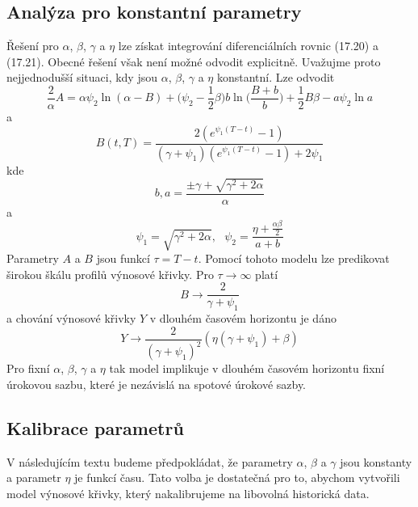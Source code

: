 \documentclass[a4paper]{book}
\begin{document}
\subsection{Analýza pro konstantní parametry}

Řešení pro $\alpha$, $\beta$, $\gamma$ a $\eta$ lze získat integrování diferenciálních rovnic (17.20) a (17.21). Obecné řešení však není možné odvodit explicitně. Uvažujme proto nejjednodušší situaci, kdy jsou $\alpha$, $\beta$, $\gamma$ a $\eta$ konstantní. Lze odvodit
\begin{equation}
\frac{2}{\alpha}A = \alpha \psi_2 \ln(\alpha - B) + \Bigg(\psi_2 - \frac{1}{2}\beta \Bigg) b \ln \Bigg(\frac{B + b}{b}\Bigg) + \frac{1}{2}B\beta - a \psi_2 \ln a 
\end{equation}
a
\begin{equation}
B(t,T) = \frac{2(e^{\psi_1(T - t)} - 1)}{(\gamma + \psi_1)(e^{\psi_1(T-t)} - 1) + 2 \psi_1}
\end{equation}
kde
\begin{equation*}
b,a = \frac{\pm \gamma + \sqrt{\gamma^2 + 2 \alpha}}{\alpha}
\end{equation*}
a
\begin{equation*}
\psi_1 = \sqrt{\gamma^2 + 2 \alpha}, ~~~ \psi_2 = \frac{\eta + \frac{\alpha \beta}{2}}{a + b}
\end{equation*}
Parametry $A$ a $B$ jsou funkcí $\tau = T - t$. Pomocí tohoto modelu lze predikovat širokou škálu profilů výnosové křivky. Pro $\tau \rightarrow \infty$ platí
\begin{equation*}
B \rightarrow \frac{2}{\gamma + \psi_1}
\end{equation*}
a chování výnosové křivky $Y$ v dlouhém časovém horizontu je dáno
\begin{equation*}
Y \rightarrow \frac{2}{(\gamma + \psi_1)^2}(\eta(\gamma + \psi_1) + \beta)
\end{equation*}
Pro fixní $\alpha$, $\beta$, $\gamma$ a $\eta$ tak model implikuje v dlouhém časovém horizontu fixní úrokovou sazbu, které je nezávislá na spotové úrokové sazby.

\subsection{Kalibrace parametrů}

V následujícím textu budeme předpokládat, že parametry $\alpha$, $\beta$ a $\gamma$ jsou konstanty a parametr $\eta$ je funkcí času. Tato volba je dostatečná pro to, abychom vytvořili model výnosové křivky, který nakalibrujeme na libovolná historická data.
\end{document}
